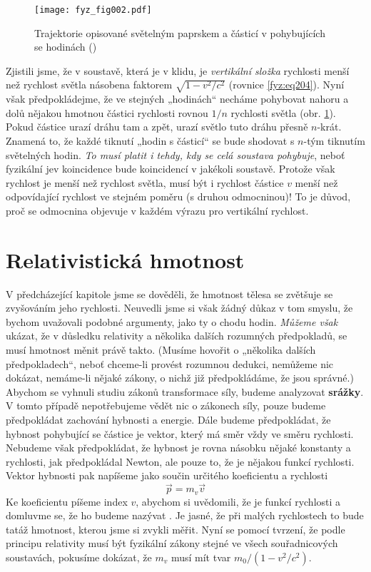     \begin{figure}[ht!]  %
      \centering
      \texttt{[image: fyz\_fig002.pdf]}
      \caption{Trajektorie opisované světelným paprskem a částicí v pohybujících se hodinách
               (\cite[s.~231]{Feynman01})}
      \label{fyz:fig002}
    \end{figure}
    Zjistili jsme, že v soustavě, která je v klidu, je \emph{vertikální složka} rychlosti menší než 
    rychlost světla násobena faktorem \(\sqrt{1 - v^2/c^2}\) (rovnice \ref{fyz:eq204}). Nyní však 
    předpokládejme, že ve stejných „hodinách“ necháme pohybovat nahoru a dolů nějakou hmotnou 
    částici rychlosti rovnou \(1 /n\) rychlosti světla (obr. \ref{fyz:fig002}). Pokud částice urazí 
    dráhu tam a zpět, urazí světlo tuto dráhu přesně \(n\)-krát. Znamená to, že každé tiknutí 
    „hodin s částicí“ se bude shodovat s \(n\)-tým tiknutím světelných hodin. \emph{To musí platit 
    i tehdy, kdy se celá soustava pohybuje}, neboť fyzikální jev koincidence bude koincidencí v 
    jakékoli soustavě. Protože však rychlost je menší než rychlost světla, musí být i rychlost 
    částice \(v\) menší než odpovídající rychlost ve stejném poměru (s druhou odmocninou)! To je 
    důvod, proč se odmocnina objevuje v každém výrazu pro vertikální rychlost.
    
  \section{Relativistická hmotnost}\label{fyz:IchapXVIsecIV}
    V předcházející kapitole jsme se dověděli, že hmotnost tělesa se zvětšuje se zvyšováním jeho 
    rychlosti. Neuvedli jsme si však žádný důkaz v tom smyslu, že bychom uvažovali podobné 
    argumenty, jako ty o chodu hodin. \emph{Můžeme však} ukázat, že v důsledku relativity a 
    několika dalších rozumných předpokladů, se musí hmotnost měnit právě takto. (Musíme hovořit o 
    „několika dalších předpokladech“, neboť chceme-li provést rozumnou dedukci, nemůžeme nic 
    dokázat, nemáme-li nějaké zákony, o nichž již předpokládáme, že jsou správné.) Abychom se 
    vyhnuli studiu zákonů transformace síly, budeme analyzovat \textbf{srážky}. V tomto případě 
    nepotřebujeme vědět nic o zákonech síly, pouze budeme předpokládat zachování hybnosti a 
    energie. Dále budeme předpokládat, že hybnost pohybující se částice je vektor, který má směr 
    vždy ve směru rychlosti. Nebudeme však předpokládat, že hybnost je rovna násobku nějaké 
    konstanty a rychlosti, jak předpokládal Newton, ale pouze to, že je nějakou funkcí rychlosti. 
    Vektor hybnosti pak napíšeme jako součin určitého koeficientu a rychlosti
    \begin{equation}\label{fyz:eq211}
      \vec{p} = m_v\vec{v}
    \end{equation}
    Ke koeficientu píšeme index \(v\), abychom si uvědomili, že je funkcí rychlosti a domluvme se, 
    že ho budeme nazývat . Je jasné, že při malých rychlostech to bude tatáž 
    hmotnost, kterou jsme si zvykli měřit. Nyní se pomocí tvrzení, že podle principu relativity 
    musí být fyzikální zákony stejné ve všech souřadnicových soustavách, pokusíme dokázat, že 
    \(m_v\) musí mít tvar \(m_0/(1 - v^2/c^2)\).
    
